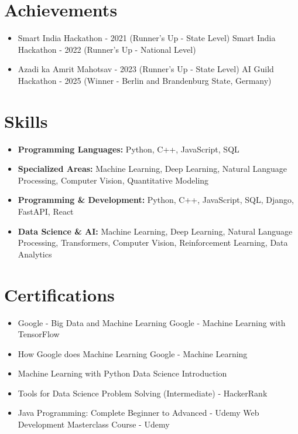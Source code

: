 \documentclass[a4paper,10pt]{article}
\begin{document}
\section*{Achievements}
\begin{itemize}
\item Smart India Hackathon - 2021 (Runner's Up - State Level) \hfill Smart India Hackathon - 2022 (Runner's Up - National Level)
\item Azadi ka Amrit Mahotsav - 2023 (Runner's Up - State Level) \hfill AI Guild Hackathon - 2025 (Winner - Berlin and Brandenburg State, Germany)
\end{itemize}

\section*{Skills}
\begin{itemize}
  \item \textbf{Programming Languages:} Python, C++, JavaScript, SQL
  \item \textbf{Specialized Areas:} Machine Learning, Deep Learning, Natural Language Processing, Computer Vision, Quantitative Modeling
  \item \textbf{Programming \& Development:} Python, C++, JavaScript, SQL, Django, FastAPI, React
  \item \textbf{Data Science \& AI:} Machine Learning, Deep Learning, Natural Language Processing, Transformers, Computer Vision, Reinforcement Learning, Data Analytics
\end{itemize}

\section*{Certifications}
\begin{itemize}
\item Google - Big Data and Machine Learning \hfill Google - Machine Learning with TensorFlow
\item How Google does Machine Learning \hfill Google - Machine Learning
\item Machine Learning with Python \hfill Data Science Introduction
\item Tools for Data Science \hfill Problem Solving (Intermediate) - HackerRank
\item Java Programming: Complete Beginner to Advanced - Udemy \hfill Web Development Masterclass Course - Udemy
\end{itemize}
\end{document}
